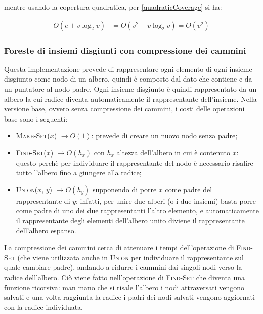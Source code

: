 mentre usando la copertura quadratica, per \eqref{quadraticCoverage} si ha:

\begin{equation}
    \label{quadraticWUH}
    \begin{aligned}
        O(e+v\log_2v) & = O(v^2+ v\log_2v) = O(v^2)
    \end{aligned}
\end{equation}

\subsubsection{Foreste di insiemi disgiunti con compressione dei cammini}
Questa implementazione prevede di rappresentare ogni elemento di ogni insieme disgiunto
come nodo di un albero, quindi è composto dal dato che contiene e da un puntatore al nodo
padre. Ogni insieme disgiunto è quindi rappresentato da un albero la cui radice diventa
automaticamente il rappresentante dell'insieme. Nella versione base, ovvero senza compressione
dei cammini, i costi delle operazioni base sono i seguenti:

\begin{itemize}
    \item \textsc{Make-Set($x$)} $\rightarrow O(1)$: prevede di creare un nuovo nodo senza padre;
    \item \textsc{Find-Set($x$)} $\rightarrow O(h_x)$ con $h_x$ altezza dell'albero in cui è contenuto $x$:
          questo perchè per individuare il rappresentante del nodo è necessario risalire tutto l'albero
          fino a giungere alla radice;
    \item \textsc{Union($x$, $y$)} $\rightarrow O(h_y)$ supponendo di porre $x$ come padre del rappresentante
          di $y$: infatti, per unire due alberi (o i due insiemi) basta porre come padre di uno dei due rappresentanti
          l'altro elemento, e automaticamente il rappresentante degli elementi dell'albero unito diviene il
          rappresentante dell'albero espanso.
\end{itemize}

La compressione dei cammini cerca di attenuare i tempi dell'operazione di \textsc{Find-Set}
(che viene utilizzata anche in \textsc{Union} per individuare il rappresentante sul quale
cambiare padre), andando a ridurre i cammini dai singoli nodi verso la radice dell'albero.
Ciò viene fatto nell'operazione di \textsc{Find-Set} che diventa una funzione ricorsiva: man
mano che si risale l'albero i nodi attraversati vengono salvati e una volta raggiunta la radice
i padri dei nodi salvati vengono aggiornati con la radice individuata.\newline

